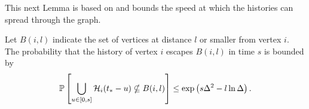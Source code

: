


	This next Lemma is based on \cite[Lemma 2.1]{Lubetzky2016-wd} and bounds the speed at which the histories can spread through the graph.
		\begin{lemma}
		\label{lem:prob history contained in ball}
			Let $B(i, l)$ indicate the set of vertices at distance $l$ or smaller from vertex $i$. The probability that the history of vertex $i$ escapes $B(i,l)$ in time $s$ is bounded by
			\begin{equation}
				\mathbb{P}\left[\bigcup_{u \in [0, s]}\mathcal{H}_i(t_* - u) \nsubseteq B(i, l)\right] \leq \exp\left(s \Delta^2 - l \ln \Delta \right).
			\end{equation}
		\end{lemma}
